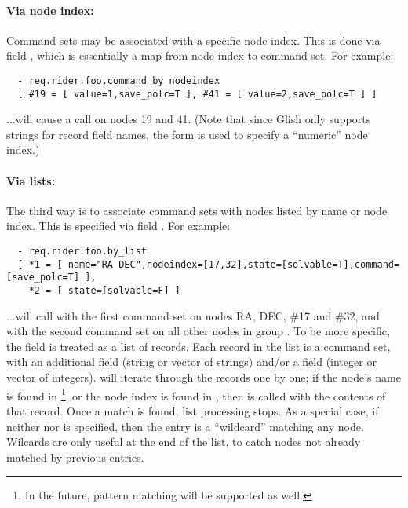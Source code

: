   \paragraph{Via node index:} Command sets may be associated with a specific
  node index. This is done via field , which is
  essentially a map from node index to command set. For example:

\begin{verbatim}
  - req.rider.foo.command_by_nodeindex
  [ #19 = [ value=1,save_polc=T ], #41 = [ value=2,save_polc=T ] ]
\end{verbatim}

  ...will cause a  call on nodes 19 and 41. (Note that
  since Glish only supports strings for record field names, the 
  form is used to specify a ``numeric'' node index.)

  \paragraph{Via lists:} The third way is to associate command sets with nodes
  listed by name or node index. This is specified via field
  . For example:

\begin{verbatim}
  - req.rider.foo.by_list
  [ *1 = [ name="RA DEC",nodeindex=[17,32],state=[solvable=T],command=[save_polc=T] ],
    *2 = [ state=[solvable=F] ]
\end{verbatim}

  ...will call  with the first command set on nodes RA,
  DEC, \#17 and \#32, and with the second command set on all other nodes in
  group . To be more specific, the  field is
  treated as a list  of records. Each record in the list is a command set, with
  an additional  field (string or vector of strings) and/or a
   field (integer or vector of integers). 
  will iterate through the records one by one; if the node's name is found in
  \footnote{In the future, pattern matching will be supported as
  well.}, or the node index is found in , then
   is called with the contents of that record. Once a
  match is found, list processing stops. As a special case, if neither
   nor  is specified, then the entry is a ``wildcard''
  matching any node. Wilcards are only useful at the end of the list, to catch
  nodes not already matched by previous entries.
  
